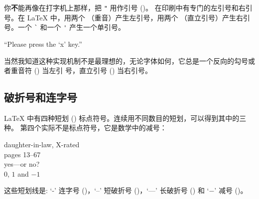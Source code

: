 你{\textbf
不}能再像在打字机上那样，把 \verb|"| 用作引号 ()。
在印刷中有专门的左引号和右引号。在 \LaTeX{} 中，用两个 \textasciigrave
（重音）产生左引号，用两个 \textquotesingle
（直立引号）产生右引号。一个 \verb|`| 和一个 \verb|'| 产生一个单引号。
\begin{example}
``Please press the `x' key.''
\end{example}
当然我知道这种实现机制不是最理想的，无论字体如何，它总是一个反向的勾号或者重音符 (\textasciigrave) 当左引
号，直立引号 (\textquotesingle) 当右引号。

\subsection{破折号和连字号}

\LaTeX{} 中有四种短划 () 标点符号。连续用不同数目的短划，可以得到其中的三种。
第四个实际不是标点符号，它是数学中的减号：\index{-} \index{--}
\index{---}  

\begin{example}
daughter-in-law, X-rated\\
pages 13--67\\
yes---or no? \\
$0$, $1$ and $-1$
\end{example}
这些短划线是:
`-' 连字号 ()，`--' 短破折号 ()，`---' 长破折号 () 
和  `$-$' 减号 ()。

